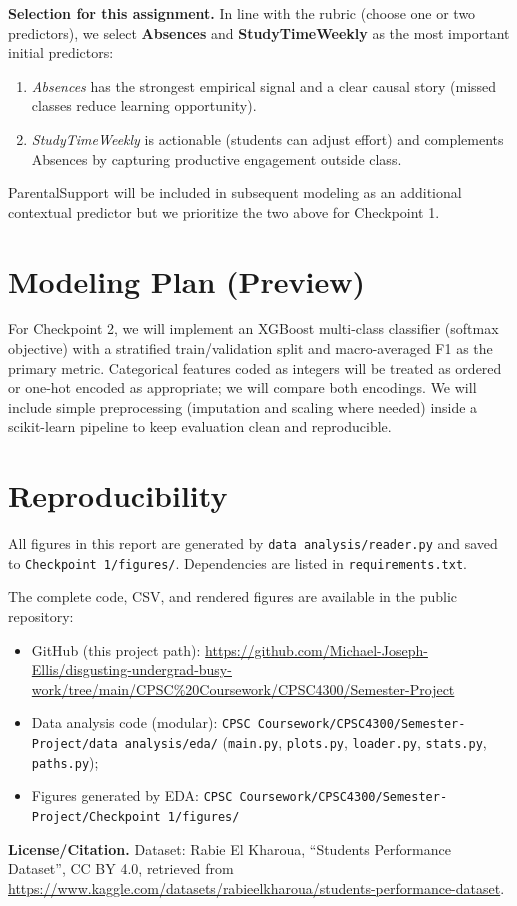 \documentclass[11pt]{article}
\begin{document}
\noindent\textbf{Selection for this assignment.} In line with the rubric (choose one or two predictors), we select \textbf{Absences} and \textbf{StudyTimeWeekly} as the most important initial predictors:
\begin{enumerate}[leftmargin=*]
	\item \emph{Absences} has the strongest empirical signal and a clear causal story (missed classes reduce learning opportunity).
	\item \emph{StudyTimeWeekly} is actionable (students can adjust effort) and complements Absences by capturing productive engagement outside class.
\end{enumerate}
ParentalSupport will be included in subsequent modeling as an additional contextual predictor but we prioritize the two above for Checkpoint 1.

\section*{Modeling Plan (Preview)}
For Checkpoint 2, we will implement an XGBoost multi-class classifier (softmax objective) with a stratified train/validation split and macro-averaged F1 as the primary metric. Categorical features coded as integers will be treated as ordered or one-hot encoded as appropriate; we will compare both encodings. We will include simple preprocessing (imputation and scaling where needed) inside a scikit-learn pipeline to keep evaluation clean and reproducible.

\section*{Reproducibility}
All figures in this report are generated by \texttt{data analysis/reader.py} and saved to \texttt{Checkpoint 1/figures/}. Dependencies are listed in \texttt{requirements.txt}.

\noindent The complete code, CSV, and rendered figures are available in the public repository:
\begin{itemize}[leftmargin=*]
	\item GitHub (this project path): \url{https://github.com/Michael-Joseph-Ellis/disgusting-undergrad-busy-work/tree/main/CPSC%20Coursework/CPSC4300/Semester-Project}
	\item Data analysis code (modular): \texttt{CPSC Coursework/CPSC4300/Semester-Project/data analysis/eda/} (\texttt{main.py}, \texttt{plots.py}, \texttt{loader.py}, \texttt{stats.py}, \texttt{paths.py}); 
	\item Figures generated by EDA: \texttt{CPSC Coursework/CPSC4300/Semester-Project/Checkpoint 1/figures/}
\end{itemize}

\vspace{.5em}
\noindent\textbf{License/Citation.} Dataset: Rabie El Kharoua, ``Students Performance Dataset'', CC BY 4.0, retrieved from \url{https://www.kaggle.com/datasets/rabieelkharoua/students-performance-dataset}.
\end{document}
